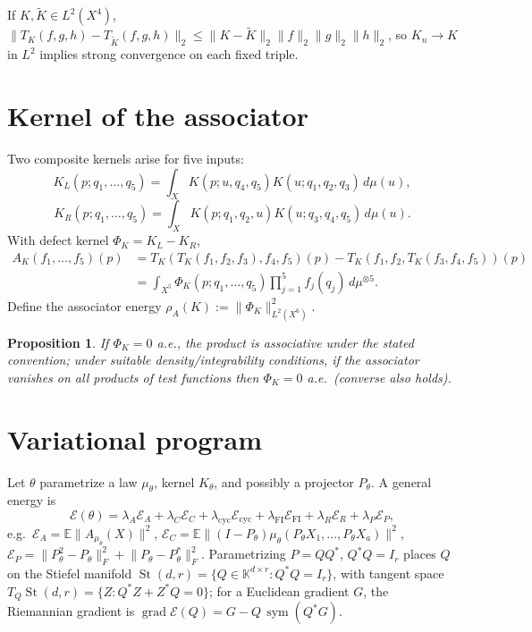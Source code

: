 \documentclass[11pt]{amsart}
\newtheorem{proposition}[theorem]{Proposition}
\theoremstyle{definition}
\theoremstyle{remark}
\begin{document}
If $K,\widetilde K\in L^2(X^4)$,
$\lVert T_K(f,g,h)-T_{\widetilde K}(f,g,h)\rVert_2 \le \lVert K-\widetilde K\rVert_2\lVert f\rVert_2\lVert g\rVert_2\lVert h\rVert_2$,
so $K_n\to K$ in $L^2$ implies strong convergence on each fixed triple.

\section{Kernel of the associator}

Two composite kernels arise for five inputs:
\[
K_L(p;q_1,\ldots,q_5) = \int_X K(p;u,q_4,q_5)K(u;q_1,q_2,q_3)\,d\mu(u),
\]
\[
K_R(p;q_1,\ldots,q_5) = \int_X K(p;q_1,q_2,u)K(u;q_3,q_4,q_5)\,d\mu(u).
\]
With defect kernel $\Phi_K = K_L-K_R$,
\begin{align*}
A_K(f_1,\ldots,f_5)(p) &= T_K(T_K(f_1,f_2,f_3),f_4,f_5)(p) - T_K(f_1,f_2,T_K(f_3,f_4,f_5))(p)\\
&= \int_{X^5}\Phi_K(p;q_1,\ldots,q_5)\prod_{j=1}^5 f_j(q_j)\,d\mu^{\otimes 5}.
\end{align*}
Define the associator energy $\rho_A(K) := \lVert\Phi_K\rVert_{L^2(X^6)}^2$.

\begin{proposition}
If $\Phi_K=0$ a.e., the product is associative under the stated
convention; under suitable density/integrability conditions, if the
associator vanishes on all products of test functions then
$\Phi_K=0$ a.e.\ (converse also holds).
\end{proposition}

\section{Variational program}

Let $\theta$ parametrize a law $\mu_\theta$, kernel $K_\theta$, and
possibly a projector $P_\theta$. A general energy is
\[
\mathcal E(\theta) = \lambda_A\mathcal E_A + \lambda_C\mathcal E_C
+ \lambda_{\mathrm{cyc}}\mathcal E_{\mathrm{cyc}} + \lambda_{\mathrm{FI}}\mathcal E_{\mathrm{FI}}
+ \lambda_R\mathcal E_R + \lambda_P\mathcal E_P,
\]
e.g.\ $\mathcal E_A = \mathbb E\lVert A_{\mu_\theta}(X)\rVert^2$,
$\mathcal E_C = \mathbb E\lVert(I-P_\theta)\mu_\theta(P_\theta X_1,\ldots,P_\theta X_a)\rVert^2$,
$\mathcal E_P = \lVert P_\theta^2-P_\theta\rVert_F^2 + \lVert P_\theta-P_\theta^*\rVert_F^2$.
Parametrizing $P=QQ^*$, $Q^*Q=I_r$ places $Q$ on the Stiefel manifold
$\operatorname{St}(d,r)=\{Q\in\mathbb K^{d\times r}: Q^*Q=I_r\}$, with
tangent space $T_Q\operatorname{St}(d,r)=\{Z: Q^*Z+Z^*Q=0\}$; for a
Euclidean gradient $G$, the Riemannian gradient is
$\operatorname{grad}\mathcal E(Q) = G-Q\,\operatorname{sym}(Q^*G)$.
\end{document}
